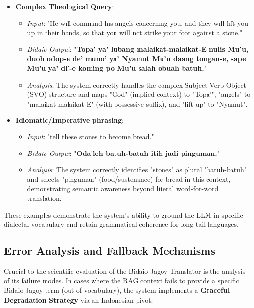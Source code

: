 \documentclass[12pt]{article}
\begin{document}
\begin{itemize}
    \item \textbf{Complex Theological Query}:
    \begin{itemize}
        \item \textit{Input}: "He will command his angels concerning you, and they will lift you up in their hands, so that you will not strike your foot against a stone."
        \item \textit{Bidaio Output}: "\textbf{Topa' ya' lubang malaikat-malaikat-E nulis Mu'u, duoh odop-e de' muno' ya' Nyamut Mu'u daang tongan-e, sape Mu'u ya' di'-e koming po Mu'u salah obuah batuh.}"
        \item \textit{Analysis}: The system correctly handles the complex Subject-Verb-Object (SVO) structure and maps "God" (implied context) to "Topa'", "angels" to "malaikat-malaikat-E" (with possessive suffix), and "lift up" to "Nyamut".
    \end{itemize}

    \item \textbf{Idiomatic/Imperative phrasing}:
    \begin{itemize}
        \item \textit{Input}: "tell these stones to become bread."
        \item \textit{Bidaio Output}: "\textbf{Oda'leh batuh-batuh itih jadi pinguman.}"
        \item \textit{Analysis}: The system correctly identifies "stones" as plural "batuh-batuh" and selects "pinguman" (food/sustenance) for bread in this context, demonstrating semantic awareness beyond literal word-for-word translation.
    \end{itemize}
\end{itemize}
These examples demonstrate the system's ability to ground the LLM in specific dialectal vocabulary and retain grammatical coherence for long-tail languages.

\subsection{Error Analysis and Fallback Mechanisms}
Crucial to the scientific evaluation of the Bidaio Jagoy Translator is the analysis of its failure modes. In cases where the RAG context fails to provide a specific Bidaio Jagoy term (out-of-vocabulary), the system implements a \textbf{Graceful Degradation Strategy} via an Indonesian pivot:
\end{document}
